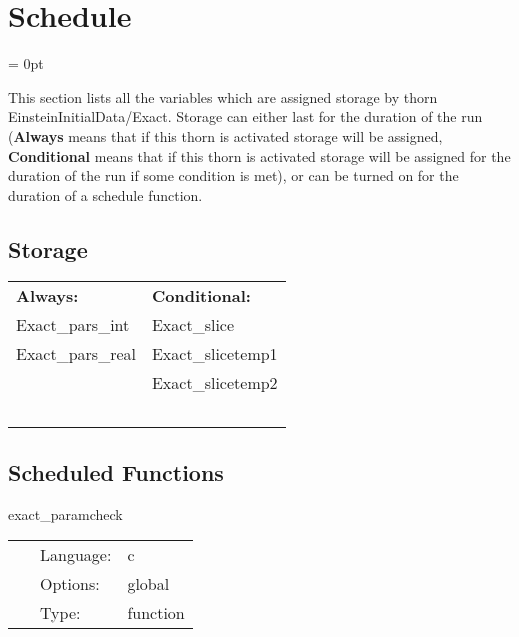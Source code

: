 
\section{Schedule} 


\parskip = 0pt


\noindent This section lists all the variables which are assigned storage by thorn EinsteinInitialData/Exact.  Storage can either last for the duration of the run ({\bf Always} means that if this thorn is activated storage will be assigned, {\bf Conditional} means that if this thorn is activated storage will be assigned for the duration of the run if some condition is met), or can be turned on for the duration of a schedule function.


\subsection*{Storage}

\hspace{5mm}

 \begin{tabular*}{160mm}{ll} 

{\bf Always:}& {\bf Conditional:} \\ 
 Exact\_pars\_int &  Exact\_slice\\ 
 Exact\_pars\_real &  Exact\_slicetemp1\\ 
~ &  Exact\_slicetemp2\\ 
~ & ~\\ 
\end{tabular*} 


\subsection*{Scheduled Functions}
\vspace{5mm}


\hspace{5mm} exact\_paramcheck 

\hspace{5mm}{\it do consistency checks on our parameters } 


\hspace{5mm}

 \begin{tabular*}{160mm}{cll} 
~ & Language:  & c \\ 
~ & Options:  & global \\ 
~ & Type:  & function \\ 
\end{tabular*} 


